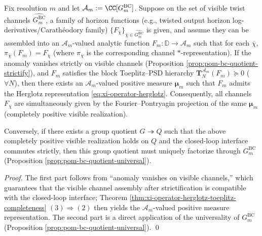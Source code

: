 \begin{theorem}\label{thm:xi-gbc-maximal-cp-visible-realization}
Fix resolution \(m\) and let \(\mathcal{A}_m:=\CC[G^{\mathrm{BC}}_m]\).
Suppose on the set of visible twist channels \(\widehat{G^{\mathrm{BC}}_m}\), a family of horizon functions (e.g., twisted output horizon log-derivatives/Carath\'eodory family)
\(\{F_{\overline\chi}\}_{\overline\chi\in\widehat{G^{\mathrm{BC}}_m}}\) is given, and assume they can be assembled into an \(\mathcal{A}_m\)-valued analytic function \(F_m:\mathbb{D}\to\mathcal{A}_m\) such that for each \(\overline\chi\), \(\pi_{\overline\chi}(F_m)=F_{\overline\chi}\) (where \(\pi_{\overline\chi}\) is the corresponding channel \(\ast\)-representation).
If the anomaly vanishes strictly on visible channels (Proposition \ref{prop:pom-bc-quotient-strictify}), and \(F_m\) satisfies the block Toeplitz--PSD hierarchy \(\mathbf{T}^{\mathcal{A}_m}_N(F_m)\succeq 0\) (\(\forall N\)), then there exists an \(\mathcal{A}_m\)-valued positive measure \(\boldsymbol\mu_m\) such that \(F_m\) admits the Herglotz representation \eqref{eq:xi-operator-herglotz}.
Consequently, all channels \(F_{\overline\chi}\) are simultaneously given by the Fourier--Pontryagin projection of the same \(\boldsymbol\mu_m\) (completely positive visible realization).
\par
Conversely, if there exists a group quotient \(G\twoheadrightarrow Q\) such that the above completely positive visible realization holds on \(Q\) and the closed-loop interface commutes strictly, then this group quotient must uniquely factorize through \(G^{\mathrm{BC}}_m\) (Proposition \ref{prop:pom-bc-quotient-universal}).
\end{theorem}

\begin{proof}
The first part follows from ``anomaly vanishes on visible channels,'' which guarantees that the visible channel assembly after strictification is compatible with the closed-loop interface; Theorem \ref{thm:xi-operator-herglotz-toeplitz-completeness} \((3)\Rightarrow(2)\) then yields the \(\mathcal{A}_m\)-valued positive measure representation.
The second part is a direct application of the universality of \(G^{\mathrm{BC}}_m\) (Proposition \ref{prop:pom-bc-quotient-universal}). \qed
\end{proof}

